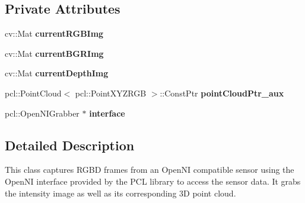 \subsection*{Private Attributes}
\begin{DoxyCompactItemize}
\item 
\hypertarget{class_c_r_g_b_d_grabber_open_n_i___p_c_l_a3b538150b8b97ac77275d0e0cc782d2f}{
cv::Mat {\bfseries currentRGBImg}}
\label{class_c_r_g_b_d_grabber_open_n_i___p_c_l_a3b538150b8b97ac77275d0e0cc782d2f}

\item 
\hypertarget{class_c_r_g_b_d_grabber_open_n_i___p_c_l_a6fe0bee4cd42ccb07c3823461630acf7}{
cv::Mat {\bfseries currentBGRImg}}
\label{class_c_r_g_b_d_grabber_open_n_i___p_c_l_a6fe0bee4cd42ccb07c3823461630acf7}

\item 
\hypertarget{class_c_r_g_b_d_grabber_open_n_i___p_c_l_af6741aa6eea71dde6d8ab2ee9bffd849}{
cv::Mat {\bfseries currentDepthImg}}
\label{class_c_r_g_b_d_grabber_open_n_i___p_c_l_af6741aa6eea71dde6d8ab2ee9bffd849}

\item 
\hypertarget{class_c_r_g_b_d_grabber_open_n_i___p_c_l_afc8b4489fc3b873162166c4803830bb5}{
pcl::PointCloud$<$ pcl::PointXYZRGB $>$::ConstPtr {\bfseries pointCloudPtr\_\-aux}}
\label{class_c_r_g_b_d_grabber_open_n_i___p_c_l_afc8b4489fc3b873162166c4803830bb5}

\item 
\hypertarget{class_c_r_g_b_d_grabber_open_n_i___p_c_l_a19dd8c4dbb891d9be9813c9e476a789c}{
pcl::OpenNIGrabber $\ast$ {\bfseries interface}}
\label{class_c_r_g_b_d_grabber_open_n_i___p_c_l_a19dd8c4dbb891d9be9813c9e476a789c}

\end{DoxyCompactItemize}


\subsection{Detailed Description}
This class captures RGBD frames from an OpenNI compatible sensor using the OpenNI interface provided by the PCL library to access the sensor data. It grabs the intensity image as well as its corresponding 3D point cloud. 

